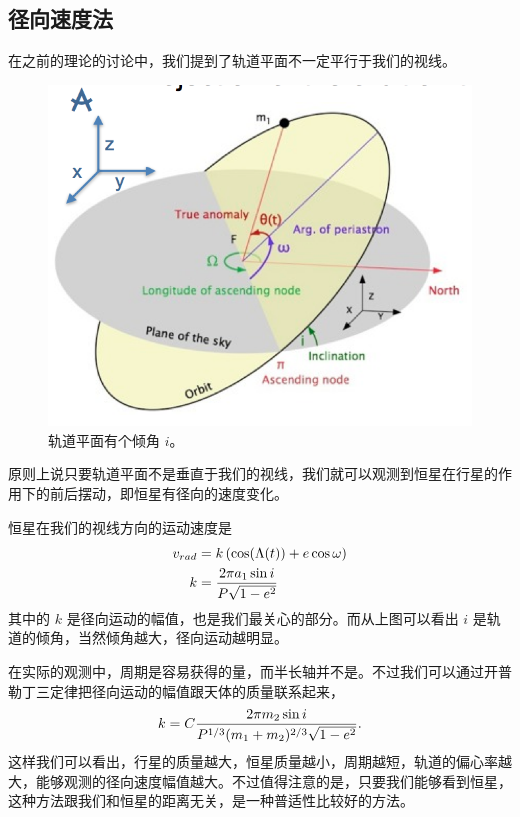 \documentclass[letterpaper,10pt,english]{sphinxmanual}
\begin{document}
\subsection{径向速度法}
\label{detection:id2}\label{detection:index-1}
在之前的理论的讨论中，我们提到了轨道平面不一定平行于我们的视线。
\begin{figure}[htbp]
\centering
\capstart

\includegraphics{tiltedOrbitPlane.png}
\caption{轨道平面有个倾角 \(i\)。}\end{figure}

原则上说只要轨道平面不是垂直于我们的视线，我们就可以观测到恒星在行星的作用下的前后摆动，即恒星有径向的速度变化。

恒星在我们的视线方向的运动速度是
\begin{gather}
\begin{split}v_{rad} &= k\left( \cos(\Lambda(t))+e\cos\omega \right) \\
k & = \frac{2\pi a_1\sin i}{P\sqrt{1-e^2}}\end{split}\notag
\end{gather}
其中的 \(k\) 是径向运动的幅值，也是我们最关心的部分。而从上图可以看出 \(i\) 是轨道的倾角，当然倾角越大，径向运动越明显。

在实际的观测中，周期是容易获得的量，而半长轴并不是。不过我们可以通过开普勒丁三定律把径向运动的幅值跟天体的质量联系起来，
\begin{gather}
\begin{split}k =C \frac{2\pi m_2 \sin i}{P^{1/3} (m_1+m_2)^{2/3}\sqrt{1-e^2}}.\end{split}\notag
\end{gather}
这样我们可以看出，行星的质量越大，恒星质量越小，周期越短，轨道的偏心率越大，能够观测的径向速度幅值越大。不过值得注意的是，只要我们能够看到恒星，这种方法跟我们和恒星的距离无关，是一种普适性比较好的方法。
\end{document}
